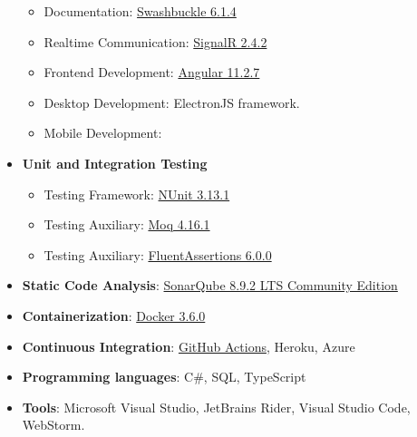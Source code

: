 \begin{itemize}
\begin{itemize}
        \item Documentation: \href{https://www.nuget.org/packages/Swashbuckle.AspNetCore/5.6.3?_src=template}{Swashbuckle 6.1.4}
        \item Realtime Communication: \href{https://www.nuget.org/packages/Microsoft.AspNet.SignalR/}{SignalR 2.4.2}
        \item Frontend Development: \href{https://angular.io/guide/setup-local}{Angular 11.2.7}
        \item Desktop Development: ElectronJS framework.
        \item Mobile Development:
    \end{itemize}
    \item \textbf{Unit and Integration Testing}
    \begin{itemize}
        \item Testing Framework: \href{https://www.nuget.org/packages/NUnit/}{NUnit 3.13.1}
        \item Testing Auxiliary: \href{https://www.nuget.org/packages/Moq/}{Moq 4.16.1}
        \item Testing Auxiliary: \href{https://www.nuget.org/packages/FluentAssertions}{FluentAssertions 6.0.0}
    \end{itemize}
    \item \textbf{Static Code Analysis}: \href{https://www.sonarqube.org/downloads/}{SonarQube 8.9.2 LTS Community Edition}
    \item \textbf{Containerization}: \href{https://docs.docker.com/desktop/windows/install/}{Docker 3.6.0}
    \item \textbf{Continuous Integration}: \href{https://docs.github.com/en/actions}{GitHub Actions}, Heroku, Azure
    \item \textbf{Programming languages}: C\#, SQL, TypeScript
    \item \textbf{Tools}: Microsoft Visual Studio, JetBrains Rider, Visual Studio Code, WebStorm.
\end{itemize}